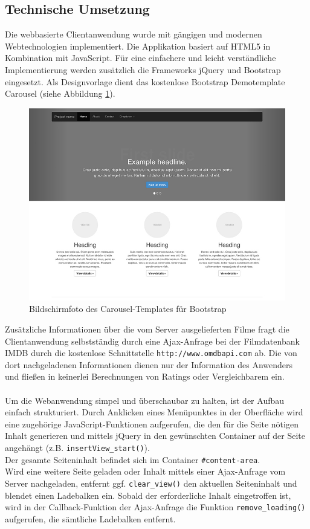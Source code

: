 \subsection{Technische Umsetzung}
Die webbasierte Clientanwendung wurde mit gängigen und modernen Webtechnologien implementiert. Die Applikation basiert auf HTML5 in Kombination mit JavaScript. Für eine einfachere und leicht verständliche Implementierung werden zusätzlich die Frameworks jQuery und Bootstrap\citep{lit:INET3} eingesetzt. Als Designvorlage dient das kostenlose Bootstrap Demotemplate \glqq Carousel\grqq\citep{lit:INET5} (siehe Abbildung \ref{pic:carousel}).\\
\begin{figure}[htb]
\centering
\includegraphics[scale=0.3]{img/carousel.jpg} 
\caption{Bildschirmfoto des Carousel-Templates für Bootstrap}
\label{pic:carousel}
\end{figure}
Zusätzliche Informationen über die vom Server ausgelieferten Filme fragt die Clientanwendung selbstständig durch eine Ajax-Anfrage bei der Filmdatenbank IMDB durch die kostenlose Schnittstelle \lstinline{http://www.omdbapi.com} ab. Die von dort nachgeladenen Informationen dienen nur der Information des Anwenders und fließen in keinerlei Berechnungen von Ratings oder Vergleichbarem ein.\\\\
Um die Webanwendung simpel und überschaubar zu halten, ist der Aufbau einfach strukturiert. Durch Anklicken eines Menüpunktes in der Oberfläche wird eine zugehörige JavaScript-Funktionen aufgerufen, die den für die Seite nötigen Inhalt generieren und mittels jQuery in den gewünschten Container auf der Seite angehängt (z.B. \lstinline{insertView_start()}).\\
Der gesamte Seiteninhalt befindet sich im Container \lstinline{#content-area}.\\
Wird eine weitere Seite geladen oder Inhalt mittels einer Ajax-Anfrage vom Server nachgeladen, entfernt ggf. \lstinline{clear_view()} den aktuellen Seiteninhalt und blendet einen Ladebalken ein. Sobald der erforderliche Inhalt eingetroffen ist, wird in der Callback-Funktion der Ajax-Anfrage die Funktion \lstinline{remove_loading()} aufgerufen, die sämtliche Ladebalken entfernt.

